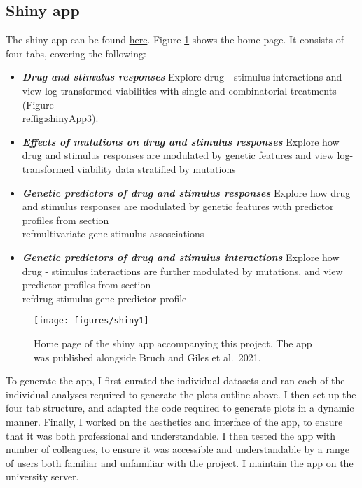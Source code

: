 \documentclass[11pt, a4paper, twosided]{book}
\begin{document}
\hypertarget{shiny-app}{%
\subsection{Shiny app}\label{shiny-app}}

The shiny app can be found \href{https://www.imbi.uni-heidelberg.de/dietrichlab/CLL_Microenvironment/}{here}. Figure \ref{fig:shinyApp1} shows the home page. It consists of four tabs, covering the following:
\begin{itemize}
    \item  \textbf{\textit{Drug and stimulus responses}} Explore drug - stimulus interactions and view log-transformed viabilities with single and combinatorial treatments (Figure \\ref{fig:shinyApp3}).
    \item \textbf{\textit{Effects of mutations on drug and stimulus responses}} Explore how drug and stimulus responses are modulated by genetic features and view log-transformed viability data stratified by mutations
    \item \textbf{\textit{Genetic predictors of drug and stimulus responses}} Explore how drug and stimulus responses are modulated by genetic features with predictor profiles from section \\ref{multivariate-gene-stimulus-assosciations}
    \item \textbf{\textit{Genetic predictors of drug and stimulus interactions}} Explore how drug - stimulus interactions are further modulated by mutations, and view predictor profiles from section \\ref{drug-stimulus-gene-predictor-profile}

\end{itemize}

\begin{figure}

{\centering \texttt{[image: figures/shiny1]} 

}

\caption{Home page of the shiny app accompanying this project. The app was published alongside Bruch and Giles et al.~2021.}\label{fig:shinyApp1}
\end{figure}
To generate the app, I first curated the individual datasets and ran each of the individual analyses required to generate the plots outline above. I then set up the four tab structure, and adapted the code required to generate plots in a dynamic manner. Finally, I worked on the aesthetics and interface of the app, to ensure that it was both professional and understandable. I then tested the app with number of colleagues, to ensure it was accessible and understandable by a range of users both familiar and unfamiliar with the project. I maintain the app on the university server.
\end{document}
